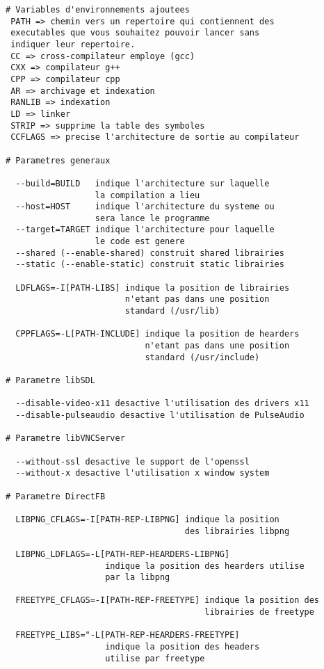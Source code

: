 \begin{lstlisting}
# Variables d'environnements ajoutees
 PATH => chemin vers un repertoire qui contiennent des
 executables que vous souhaitez pouvoir lancer sans
 indiquer leur repertoire.
 CC => cross-compilateur employe (gcc)
 CXX => compilateur g++
 CPP => compilateur cpp
 AR => archivage et indexation
 RANLIB => indexation
 LD => linker
 STRIP => supprime la table des symboles
 CCFLAGS => precise l'architecture de sortie au compilateur

# Parametres generaux
  
  --build=BUILD   indique l'architecture sur laquelle
                  la compilation a lieu
  --host=HOST     indique l'architecture du systeme ou
                  sera lance le programme   
  --target=TARGET indique l'architecture pour laquelle
                  le code est genere
  --shared (--enable-shared) construit shared librairies
  --static (--enable-static) construit static librairies
 
  LDFLAGS=-I[PATH-LIBS] indique la position de librairies
                        n'etant pas dans une position
                        standard (/usr/lib)
  
  CPPFLAGS=-L[PATH-INCLUDE] indique la position de hearders
                            n'etant pas dans une position
                            standard (/usr/include)
  
# Parametre libSDL

  --disable-video-x11 desactive l'utilisation des drivers x11 
  --disable-pulseaudio desactive l'utilisation de PulseAudio
  
# Parametre libVNCServer  

  --without-ssl desactive le support de l'openssl
  --without-x desactive l'utilisation x window system
  
# Parametre DirectFB 

  LIBPNG_CFLAGS=-I[PATH-REP-LIBPNG] indique la position
                                    des librairies libpng
  
  LIBPNG_LDFLAGS=-L[PATH-REP-HEARDERS-LIBPNG] 
  					indique la position des hearders utilise 
  					par la libpng
  
  FREETYPE_CFLAGS=-I[PATH-REP-FREETYPE] indique la position des
                                        librairies de freetype
 
  FREETYPE_LIBS="-L[PATH-REP-HEARDERS-FREETYPE] 
                    indique la position des headers
                    utilise par freetype
 

\end{lstlisting}
